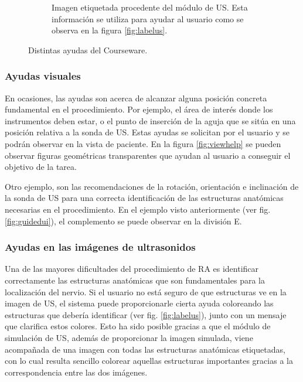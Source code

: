 \begin{figure}[ht]
\begin{subfigure}[b]{0.4\linewidth}
        \caption{Imagen etiquetada procedente del módulo de \acs{US}. Esta información se utiliza para ayudar al usuario como se observa en la figura \ref{fig:labelus}.
    \label{fig:etiquetas}}
    \end{subfigure}
    \caption{Distintas ayudas del \acs{Courseware}.}
   \end{figure}
 
\subsubsection{Ayudas visuales}

En ocasiones, las ayudas son acerca de alcanzar alguna posición concreta fundamental en el procedimiento. Por ejemplo, el área de interés donde los instrumentos deben estar, o el punto de inserción de la aguja que se sitúa en una posición relativa a la sonda de \ac{US}. Estas ayudas se solicitan por el usuario y se podrán observar en la vista de paciente. En la figura \ref{fig:viewhelp} se pueden observar figuras geométricas transparentes que ayudan al usuario a conseguir el objetivo de la tarea.
 
 


Otro ejemplo, son las recomendaciones de la rotación, orientación e inclinación de la sonda de \ac{US} para una correcta identificación de las estructuras anatómicas necesarias en el procedimiento. En el ejemplo visto anteriormente (ver fig. \ref{fig:guidedui}), el complemento se puede observar en la división E.


\subsubsection{Ayudas en las imágenes de ultrasonidos}
Una de las mayores dificultades del procedimiento de \ac{RA} es identificar correctamente las estructuras anatómicas que son fundamentales para la localización del nervio. Si el usuario no está seguro de que estructuras ve en la imagen de \ac{US}, el sistema puede proporcionarle cierta ayuda coloreando las estructuras que debería identificar (ver fig. \ref{fig:labelus}), junto con un mensaje que clarifica estos colores. Esto ha sido posible gracias a que el módulo de simulación de \ac{US}, además de proporcionar la imagen simulada, viene acompañada de una imagen con todas las estructuras anatómicas etiquetadas, con lo cual resulta sencillo colorear aquellas estructuras importantes gracias a la correspondencia entre las dos imágenes.


